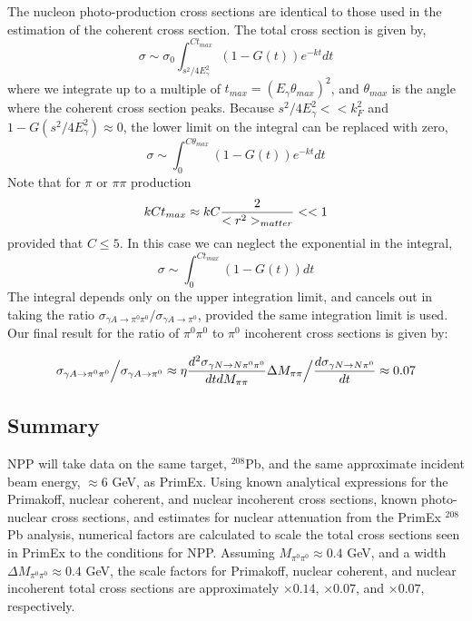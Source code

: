 The nucleon photo-production cross sections are identical to those used in the estimation of the coherent cross section.   The total cross section is given by, 
$$\sigma \sim \sigma_0 \int^{Ct_{max}}_{s^2/4E^2_\gamma} ( 1 - G(t) ) e^{-kt} dt $$
where we integrate up to a multiple of $t_{max} = (E_\gamma \theta_{max})^2$, and $\theta_{max}$  is the angle where the coherent cross section peaks.   Because $s^2/4E^2_\gamma << k^2_F$ and $1-G(s^2/4E^2_\gamma) \approx 0$, the lower limit on the integral can be replaced with zero, 
$$\sigma \sim \int^{C\theta_{max}}_0 ( 1 - G(t) ) e^{-kt}  dt $$
Note that for $\pi$ or $\pi \pi$ production 
$$ k C t_{max} \approx k C { 2 \over <r^2>_{matter} }  << 1 $$
provided that $C \le 5$. In this case we can neglect the exponential in the integral, 
$$\sigma \sim \int^{C t_{max}}_0 ( 1 - G(t) ) dt $$
The integral depends only on the upper integration limit,   and cancels out in taking the ratio $ \sigma_{\gamma A \rightarrow  \pi^0 \pi^0}  \Big/ \sigma_{\gamma A \rightarrow  \pi^0} $, provided the same integration limit is used. 
Our final result for the ratio of  $\pi^0 \pi^0$ to $\pi^0$ incoherent cross sections is given by: 

$$  \sigma_{\gamma A \rightarrow  \pi^0 \pi^0}  \Big/ \sigma_{\gamma A \rightarrow  \pi^0}  \approx \eta 
 {d^2\sigma_{\gamma N \rightarrow N \pi^0 \pi^0} \over dt dM_{\pi \pi} }  \Delta M_{\pi \pi}\Big/ { d\sigma_{\gamma N \rightarrow N \pi^0} \over dt} \approx 0.07 $$

\subsection{Summary}
NPP will take data on the same target, $^{208}$Pb, and the same approximate incident beam energy, $\approx 6$ GeV, as PrimEx. Using known analytical expressions for the Primakoff, nuclear coherent, and nuclear incoherent cross sections, known photo-nuclear cross sections, and estimates for nuclear attenuation from the PrimEx $^{208}$Pb analysis, numerical factors are calculated to scale the total cross sections seen in PrimEx to the 
conditions for NPP.  Assuming $M_{\pi^0 \pi^0} \approx 0.4$ GeV, and a width  $\Delta M_{\pi^0 \pi^0} \approx 0.4$ GeV, the scale factors for Primakoff, nuclear coherent, and nuclear incoherent total cross sections are approximately $\times 0.14$, $\times 0.07$, and $\times 0.07$, respectively. 

